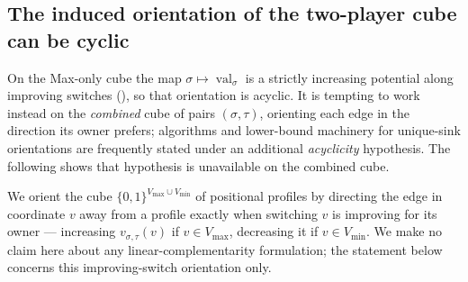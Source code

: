 \documentclass[11pt]{article}
\theoremstyle{plain}
\theoremstyle{definition}
\DeclareMathOperator{\val}{val}
\newcommand{\Vmax}{V_{\max}}
\newcommand{\Vmin}{V_{\min}}
\begin{document}
\subsection{The induced orientation of the two-player cube can be cyclic}

On the Max-only cube the map $\sigma\mapsto\val_\sigma$ is a strictly
increasing potential along improving switches (), so
that orientation is acyclic. It is tempting to work instead on the
\emph{combined} cube of pairs $(\sigma,\tau)$, orienting each edge in the
direction its owner prefers; algorithms and lower-bound machinery for
unique-sink orientations are frequently stated under an additional
\emph{acyclicity} hypothesis. The following shows that hypothesis is
unavailable on the combined cube.

We orient the cube $\{0,1\}^{\Vmax\cup\Vmin}$ of positional profiles by
directing the edge in coordinate $v$ away from a profile exactly when
switching $v$ is improving for its owner --- increasing $v_{\sigma,\tau}(v)$
if $v\in\Vmax$, decreasing it if $v\in\Vmin$. We make no claim here about
any linear-complementarity formulation; the statement below concerns this
improving-switch orientation only.
\end{document}

